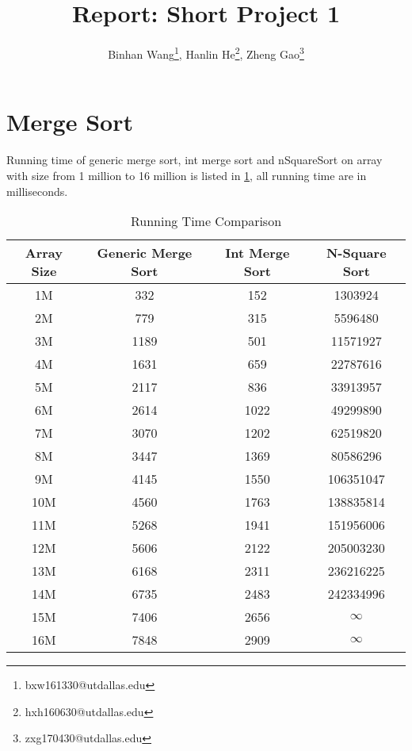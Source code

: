 \documentclass[10pt]{article}
\title{\vspace*{-1em}Report: Short Project 1}
\author{Binhan Wang\footnote{bxw161330@utdallas.edu}, Hanlin He\footnote{hxh160630@utdallas.edu},
Zheng Gao\footnote{zxg170430@utdallas.edu}}
\begin{document}
\maketitle

\section{Merge Sort}

Running time of generic merge sort, int merge sort and nSquareSort on array
with size from 1 million to 16 million is listed in \cref{r1}, all running time
are in milliseconds.

\begin{table}[H]
    \centering
    \caption{Running Time Comparison}\label{r1}
    \begin{tabular}{c|ccc}
        Array Size & Generic Merge Sort & Int Merge Sort & N-Square Sort \\\hline\hline
        1M & 332 & 152 & 1303924\\
        2M & 779 & 315 & 5596480 \\
        3M & 1189 & 501 & 11571927 \\
        4M & 1631 & 659 & 22787616 \\
        5M & 2117 & 836 & 33913957 \\
        6M & 2614 & 1022 & 49299890 \\
        7M & 3070 & 1202 & 62519820 \\
        8M & 3447 & 1369 & 80586296 \\
        9M & 4145 & 1550 & 106351047 \\
        10M & 4560 & 1763 & 138835814 \\
        11M & 5268 & 1941 & 151956006 \\
        12M & 5606 & 2122 & 205003230 \\
        13M & 6168 & 2311 & 236216225 \\
        14M & 6735 & 2483 & 242334996 \\
        15M & 7406 & 2656 & $\infty$ \\
        16M & 7848 & 2909 & $\infty$ \\
    \end{tabular}
\end{table}
\end{document}
